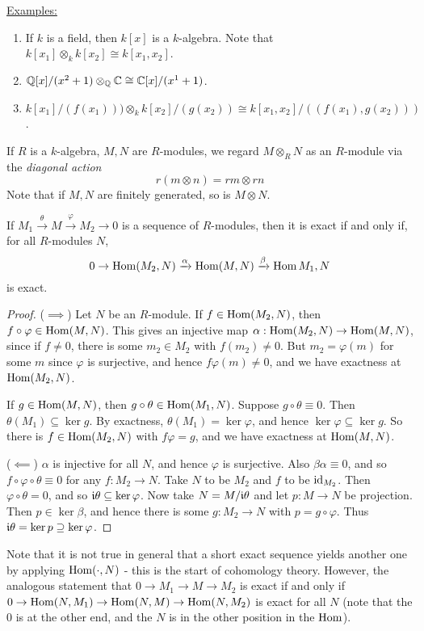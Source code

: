 \documentclass[10pt,a4paper]{article}
\begin{document}
\underline{Examples:}
\begin{enumerate}
  \item If $k$ is a field, then $k[x]$ is a $k$-algebra. Note that $k[x_1]\otimes_k k[x_2] \cong k[x_1,x_2]$.
  \item $\mathbb{Q}[x]/(x^2+1) \otimes_{\mathbb{Q}} \mathbb{C} \cong \mathbb{C}[x]/(x^1+1)$.
  \item $k[x_1]/(f(x_1))) \otimes_k k[x_2]/(g(x_2)) \cong k[x_1,x_2]/((f(x_1), g(x_2)))$.
\end{enumerate}

\begin{definition}
  If $R$ is a $k$-algebra, $M, N$ are $R$-modules, we regard $M \otimes_R N$ as an $R$-module via the \emph{diagonal action}
  \[r(m\otimes n) = rm\otimes rn\]
  Note that if $M, N$ are finitely generated, so is $M\otimes N$.
\end{definition}
\begin{lemma}
  If $M_1 \xrightarrow{\theta} M \xrightarrow{\varphi} M_2 \to 0$ is a sequence of $R$-modules, then it is exact if and only if, for all $R$-modules $N$,
  \[0 \to \operatorname{Hom}(M_2, N) \xrightarrow{\alpha} \operatorname{Hom}(M, N) \xrightarrow{\beta} \operatorname{Hom}{M_1, N}\]
  is exact.
\end{lemma}
\begin{proof}
  ($\implies$) Let $N$ be an $R$-module. If $f \in \operatorname{Hom}(M_2, N)$, then $f \circ \varphi \in \operatorname{Hom}(M, N)$. This gives an injective map $\alpha: \operatorname{Hom}(M_2, N) \to \operatorname{Hom}(M,N)$, since if $f \neq 0$, there is some $m_2 \in M_2$ with $f(m_2) \neq 0$. But $m_2 = \varphi(m)$ for some $m$ since $\varphi$ is surjective, and hence $f \varphi(m) \neq 0$, and we have exactness at $\operatorname{Hom}(M_2, N)$.

  If $g \in \operatorname{Hom}(M,N)$, then $g \circ \theta \in \operatorname{Hom}(M_1, N)$. Suppose $g \circ \theta \equiv 0$. Then $\theta(M_1) \subseteq \ker g$. By exactness, $\theta(M_1) = \ker \varphi$, and hence $\ker \varphi \subseteq \ker g$. So there is $f \in \operatorname{Hom}(M_2, N)$ with $f\varphi = g$, and we have exactness at $\operatorname{Hom}(M,N)$.

  ($\impliedby$) $\alpha$ is injective for all $N$, and hence $\varphi$ is surjective. Also $\beta \alpha \equiv 0$, and so $f \circ \varphi \circ \theta \equiv 0$ for any $f : M_2 \to N$. Take $N$ to be $M_2$ and $f$ to be $\operatorname{id}_{M_2}$. Then $\varphi \circ \theta = 0$, and so $\mathfrak{i} \theta \subseteq \ker \varphi$. Now take $N = M/\mathfrak{i} \theta$ and let $p: M\to N$ be projection. Then $p \in \ker \beta$, and hence there is some $g:M_2 \to N$ with $p = g \circ \varphi$. Thus $\mathfrak{i} \theta = \ker p \supseteq \ker \varphi$.
\end{proof}
Note that it is not true in general that a short exact sequence yields another one by applying $\operatorname{Hom}(\cdot, N)$ - this is the start of cohomology theory. However, the analogous statement that $0 \to M_1 \to M \to M_2$ is exact if and only if $0 \to \operatorname{Hom}(N, M_1) \to \operatorname{Hom}(N, M) \to \operatorname{Hom}(N, M_2)$ is exact for all $N$ (note that the 0 is at the other end, and the $N$ is in the other position in the $\operatorname{Hom}$).
\end{document}
